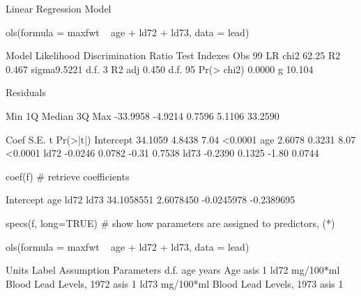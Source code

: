 \begin{Schunk}
\begin{Soutput}
Linear Regression Model
 
 ols(formula = maxfwt ~ age + ld72 + ld73, data = lead)
 
 
                 Model Likelihood    Discrimination    
                       Ratio Test           Indexes    
 Obs      99    LR chi2     62.25    R2       0.467    
 sigma9.5221    d.f.            3    R2 adj   0.450    
 d.f.     95    Pr(> chi2) 0.0000    g       10.104    
 
 Residuals
 
      Min       1Q   Median       3Q      Max 
 -33.9958  -4.9214   0.7596   5.1106  33.2590 
 
 
           Coef    S.E.   t     Pr(>|t|)
 Intercept 34.1059 4.8438  7.04 <0.0001 
 age        2.6078 0.3231  8.07 <0.0001 
 ld72      -0.0246 0.0782 -0.31 0.7538  
 ld73      -0.2390 0.1325 -1.80 0.0744  
 
\end{Soutput}
\begin{Sinput}
coef(f)   # retrieve coefficients
\end{Sinput}
\begin{Soutput}
 Intercept        age       ld72       ld73 
34.1058551  2.6078450 -0.0245978 -0.2389695 
\end{Soutput}
\begin{Sinput}
specs(f, long=TRUE)   # show how parameters are assigned to predictors, (*\ipacue*)
\end{Sinput}
\begin{Soutput}
ols(formula = maxfwt ~ age + ld72 + ld73, data = lead)

     Units     Label                   Assumption Parameters d.f.
age  years     Age                     asis                  1   
ld72 mg/100*ml Blood Lead Levels, 1972 asis                  1   
ld73 mg/100*ml Blood Lead Levels, 1973 asis                  1   


\end{Soutput}
\end{Schunk}
